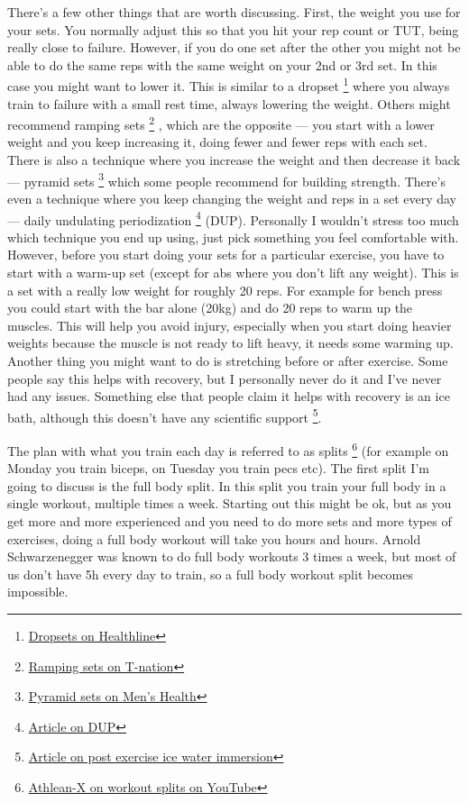 \documentclass[openany, 12pt]{book}
\begin{document}
        There's a few other things that are worth discussing. First, the weight you use for your sets. You normally adjust this so that you hit your rep count or TUT, being really close to failure.
        However, if you do one set after the other you might not be able to do the same reps with the same weight on your 2nd or 3rd set. In this case you might want to lower it. This is similar to
        a dropset
        \footnote{\href{https://www.healthline.com/nutrition/what-is-a-drop-set}{Dropsets on Healthline}}
        where you always train to failure with a small rest time, always lowering the weight. Others might recommend ramping sets
        \footnote{\href{https://www.t-nation.com/training/thibaudeau-on-ramping/}{Ramping sets on T-nation}}
        , which are the opposite --- you start with a lower weight and you keep increasing it, doing fewer and fewer reps with each set. There is also a technique where you increase the weight and then
        decrease it back --- pyramid sets
        \footnote{\href{https://www.menshealth.com/fitness/a36317637/pyramid-sets/}{Pyramid sets on Men's Health}} which some people recommend for building strength. There's even a technique
        where you keep changing the weight and reps in a set every day --- daily undulating periodization
        \footnote{\href{https://pubmed.ncbi.nlm.nih.gov/11991778/}{Article on DUP}} (DUP). Personally I wouldn't stress too
        much which technique you end up using, just pick something you feel comfortable with. However, before you start doing your sets for a particular exercise, you have to start with a warm-up set
        (except for abs where you don't lift any weight).
        This is a set with a really low weight for roughly 20 reps. For example for bench press you could start with the bar alone (20kg) and do 20 reps to warm up the muscles. This will help you avoid
        injury, especially when you start doing heavier weights because the muscle is not ready to lift heavy, it needs some warming up. Another thing you might want to do is stretching before or
        after exercise. Some people say this helps with recovery, but I personally never do it and I've never had any issues. Something else that people claim it helps with recovery is an ice bath,
        although this doesn't have any scientific support
        \footnote{\href{https://www.ncbi.nlm.nih.gov/pmc/articles/PMC2938508/}{Article on post exercise ice water immersion}}.

        The plan with what you train each day is referred to as splits
        \footnote{\href{https://www.youtube.com/watch?v=RDWyqnGhmWY}{Athlean-X on workout splits on YouTube}} (for example on Monday you train biceps, on Tuesday you train pecs etc).
        The first split I'm going to discuss is the full body split. In this split
        you train your full body in a single workout, multiple times a week. Starting out this might be ok, but as you get more and more experienced and you need to do more sets and more types of
        exercises, doing a full body workout will take you hours and hours. Arnold Schwarzenegger was known to do full body workouts 3 times a week, but most of us don't have 5h every day to train, so
        a full body workout split becomes impossible.
\end{document}

